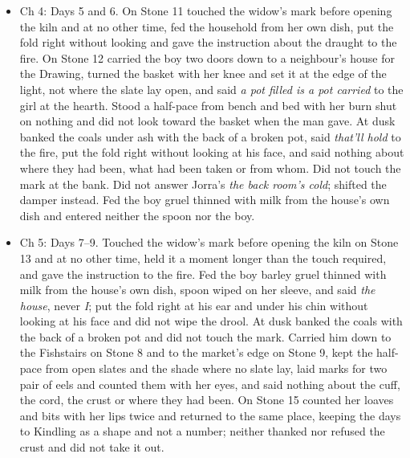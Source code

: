 \documentclass{design/chronicle}
\begin{document}
{\begin{itemize}[leftmargin=1.4em,itemsep=1pt,topsep=3pt,parsep=0pt]
\item Ch 4: Days 5 and 6. On Stone 11 touched the widow’s mark before opening the kiln and at no other time, fed the household from her own dish, put the fold right without looking and gave the instruction about the draught to the fire. On Stone 12 carried the boy two doors down to a neighbour’s house for the Drawing, turned the basket with her knee and set it at the edge of the light, not where the slate lay open, and said \emph{a pot filled is a pot carried} to the girl at the hearth. Stood a half-pace from bench and bed with her burn shut on nothing and did not look toward the basket when the man gave. At dusk banked the coals under ash with the back of a broken pot, said \emph{that’ll hold} to the fire, put the fold right without looking at his face, and said nothing about where they had been, what had been taken or from whom. Did not touch the mark at the bank. Did not answer Jorra’s \emph{the back room’s cold}; shifted the damper instead. Fed the boy gruel thinned with milk from the house’s own dish and entered neither the spoon nor the boy.

\end{itemize}

\begin{itemize}[leftmargin=1.4em,itemsep=1pt,topsep=3pt,parsep=0pt]

\item Ch 5: Days 7--9. Touched the widow’s mark before opening the kiln on Stone 13 and at no other time, held it a moment longer than the touch required, and gave the instruction to the fire. Fed the boy barley gruel thinned with milk from the house’s own dish, spoon wiped on her sleeve, and said \emph{the house}, never \emph{I}; put the fold right at his ear and under his chin without looking at his face and did not wipe the drool. At dusk banked the coals with the back of a broken pot and did not touch the mark. Carried him down to the Fishstairs on Stone 8 and to the market’s edge on Stone 9, kept the half-pace from open slates and the shade where no slate lay, laid marks for two pair of eels and counted them with her eyes, and said nothing about the cuff, the cord, the crust or where they had been. On Stone 15 counted her loaves and bits with her lips twice and returned to the same place, keeping the days to Kindling as a shape and not a number; neither thanked nor refused the crust and did not take it out.

\end{itemize}

\begin{itemize}[leftmargin=1.4em,itemsep=1pt,topsep=3pt,parsep=0pt]


\end{itemize}}
\end{document}

